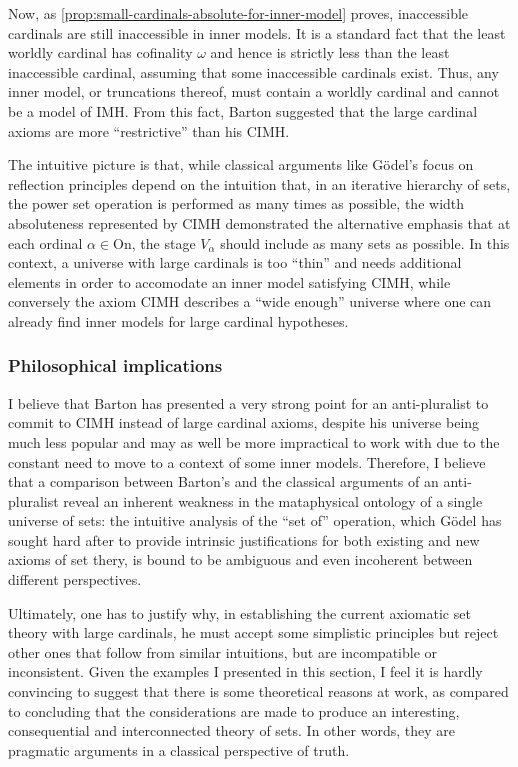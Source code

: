 \documentclass[12pt]{article}
\theoremstyle{plain}
\theoremstyle{definition}
\newcommand{\On}{\mathrm{On}}
\newcommand{\IMH}{\mathrm{IMH}}
\newcommand{\CIMH}{\mathrm{CIMH}}
\begin{document}
Now, as \autoref{prop:small-cardinals-absolute-for-inner-model} proves, inaccessible cardinals are still inaccessible in inner models. It is a standard fact that the least worldly cardinal has cofinality $\omega$ and hence is strictly less than the least inaccessible cardinal, assuming that some inaccessible cardinals exist. Thus, any inner model, or truncations thereof, must contain a worldly cardinal and cannot be a model of $\IMH$. From this fact, Barton suggested that the large cardinal axioms are more ``restrictive'' than his $\CIMH$.

The intuitive picture is that, while classical arguments like G\"odel's focus on reflection principles depend on the intuition that, in an iterative hierarchy of sets, the power set operation is performed as many times as possible, the width absoluteness represented by $\CIMH$ demonstrated the alternative emphasis that at each ordinal $\alpha \in \On$, the stage $V_\alpha$ should include as many sets as possible. In this context, a universe with large cardinals is too ``thin'' and needs additional elements in order to accomodate an inner model satisfying $\CIMH$, while conversely the axiom $\CIMH$ describes a ``wide enough'' universe where one can already find inner models for large cardinal hypotheses.

\subsubsection*{Philosophical implications}

I believe that Barton has presented a very strong point for an anti-pluralist to commit to $\CIMH$ instead of large cardinal axioms, despite his universe being much less popular and may as well be more impractical to work with due to the constant need to move to a context of some inner models. Therefore, I believe that a comparison between Barton's and the classical arguments of an anti-pluralist reveal an inherent weakness in the mataphysical ontology of a single universe of sets: the intuitive analysis of the ``set of'' operation, which G\"odel has sought hard after to provide intrinsic justifications for both existing and new axioms of set thery, is bound to be ambiguous and even incoherent between different perspectives.

Ultimately, one has to justify why, in establishing the current axiomatic set theory with large cardinals, he must accept some simplistic principles but reject other ones that follow from similar intuitions, but are incompatible or inconsistent. Given the examples I presented in this section, I feel it is hardly convincing to suggest that there is some theoretical reasons at work, as compared to concluding that the considerations are made to produce an interesting, consequential and interconnected theory of sets. In other words, they are pragmatic arguments in a classical perspective of truth.
\end{document}
